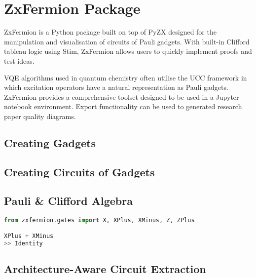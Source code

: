 \chapter{\label{zxfermion-package}ZxFermion Package}

ZxFermion is a Python package built on top of PyZX designed for the manipulation and visualisation of circuits of Pauli gadgets. With built-in Clifford tableau logic using Stim, ZxFermion allows users to quickly implement proofs and test ideas.

VQE algorithms used in quantum chemistry often utilise the UCC framework in which excitation operators have a natural representation as Pauli gadgets. ZxFermion provides a comprehensive toolset designed to be used in a Jupyter notebook environment. Export functionality can be used to generated research paper quality diagrams.

\section{Creating Gadgets}
\section{Creating Circuits of Gadgets}
\section{Pauli \& Clifford Algebra}
\begin{lstlisting}[language=Python]
from zxfermion.gates import X, XPlus, XMinus, Z, ZPlus

XPlus + XMinus
>> Identity
\end{lstlisting}

\section{Architecture-Aware Circuit Extraction}


